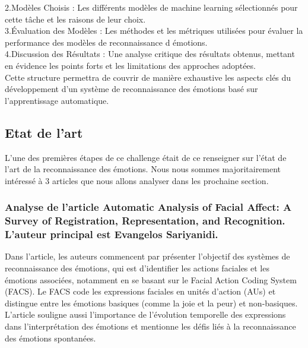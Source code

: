 \documentclass{rapport}
\begin{document}
2.Modèles Choisis :
Les différents modèles de machine learning sélectionnés pour cette tâche et les raisons de leur choix.\\

3.Évaluation des Modèles :
Les méthodes et les métriques utilisées pour évaluer la performance des modèles de reconnaissance d émotions.\\

4.Discussion des Résultats :
Une analyse critique des résultats obtenus,
mettant en évidence les points forts et les limitations des approches adoptées.\\

Cette structure permettra de couvrir de manière exhaustive les aspects clés du développement
d'un système de reconnaissance des émotions basé sur l'apprentissage automatique.

\subsection{Etat de l'art}

L'une des premières étapes de ce challenge était de ce renseigner sur l'état
de l'art de la reconnaissance des émotions. Nous nous sommes majoritairement
intéressé à 3 articles que nous allons analyser dans les prochaine section.

\subsubsection{Analyse de l'article \cite{sariyanidiAutomaticAnalysisFacial2015} Automatic Analysis of Facial Affect: A Survey of Registration, Representation, and Recognition. L'auteur principal est Evangelos Sariyanidi.}

Dans l'article, les auteurs commencent par présenter l'objectif des systèmes de 
reconnaissance des émotions, qui est d'identifier les actions faciales et les 
émotions associées, notamment en se basant sur le Facial Action Coding System (FACS).
Le FACS code les expressions faciales en unités d'action (AUs) et distingue entre 
les émotions basiques (comme la joie et la peur) et non-basiques. L'article 
souligne aussi l'importance de l'évolution temporelle des expressions dans 
l'interprétation des émotions et mentionne les défis liés à la reconnaissance des 
émotions spontanées.
\end{document}
